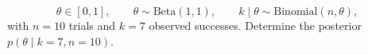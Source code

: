 \[
  \theta \in [0,1], \qquad
  \theta \sim \mathrm{Beta}(1, 1), \qquad
  k \mid \theta \sim \mathrm{Binomial}(n, \theta),
\]
with $n = 10$ trials and $k = 7$ observed successes. Determine the posterior
$p(\theta \mid k = 7, n = 10)$.
